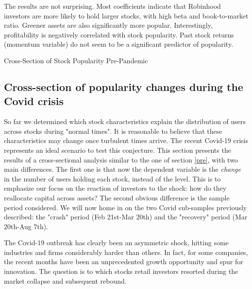 \documentclass[12pt]{article}
\numberwithin{equation}{section} %
\begin{document}
The results are not surprising. Most coefficients indicate that Robinhood investors are more likely to hold larger stocks, with high beta and book-to-market ratio. Greener assets are also significantly more popular. Interestingly, profitability is negatively correlated with stock popularity. Past stock returns (momentum variable) do not seem to be a significant predictor of popularity.

\begin{table} 
\caption{Cross-Section of Stock Popularity Pre-Pandemic}
 \label{prereg}
\end{table}




\subsection{Cross-section of popularity changes during the Covid crisis} \label{covid}

So far we determined which stock characteristics explain the distribution of users across stocks during "normal times". It is reasonable to believe that these characteristics may change once turbulent times arrive. The recent Covid-19 crisis represents an ideal scenario to test this conjecture. This section presents the results of a cross-sectional analysis similar to the one of section \ref{pre}, with two main differences. The first one is that now the dependent variable is the \emph{change} in the number of users holding each stock, instead of the level. This is to emphasize our focus on the reaction of investors to the shock: how do they reallocate capital across assets? The second obvious difference is the sample period considered. We will now home in on the two Covid sub-samples previously described: the "crash" period (Feb 21st-Mar 20th) and the "recovery" period (Mar 20th-Aug 7th).

The Covid-19 outbreak has clearly been an asymmetric shock, hitting some industries and firms considerably harder than others. In fact, for some companies, the recent months have been an unprecedented growth opportunity and spur for innovation. The question is to which stocks retail investors resorted during the market collapse and subsequent rebound.
\end{document}
